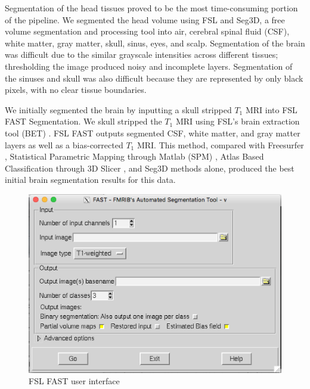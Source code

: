 
Segmentation of the head tissues proved to be the most time-consuming portion of the pipeline. We segmented the head volume using FSL and Seg3D, a free volume segmentation and processing tool \cite{ref:seg3d} into air, cerebral spinal fluid (CSF), white matter, gray matter, skull, sinus, eyes, and scalp. Segmentation of the brain was difficult due to the similar grayscale intensities across different tissues; thresholding the image produced noisy and incomplete layers. Segmentation of the sinuses and skull was also difficult because they are represented by only black pixels, with no clear tissue boundaries.

We initially segmented the brain by inputting a skull stripped $T_1$ MRI into FSL FAST Segmentation. We skull stripped the $T_1$ MRI using FSL's brain extraction tool (BET) \cite{ref:bet1}. FSL FAST outputs segmented CSF, white matter, and gray matter layers as well as a bias-corrected $T_1$ MRI. This method, compared with Freesurfer \cite{ref:freesurf}, Statistical Parametric Mapping through Matlab (SPM) \cite{ref:spm}, Atlas Based Classification through 3D Slicer \cite{ref:abc}, and Seg3D methods alone, produced the best initial brain segmentation results for this data.
\begin{figure}[H]
    \centering
    \includegraphics[width=.8\textwidth]{Figures/FSL_FAST}
    \caption{FSL FAST user interface}
    \label{fig:fslfast}
\end{figure}

